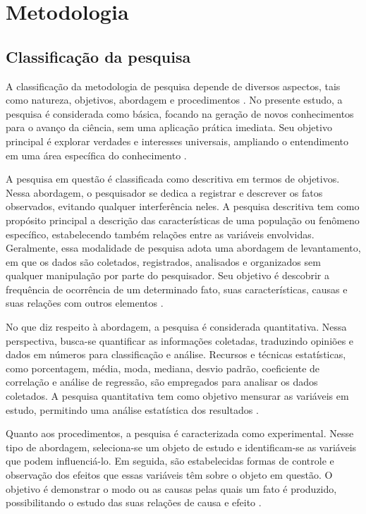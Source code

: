 \chapter[Metodologia]{Metodologia}

\section{Classificação da pesquisa}
A classificação da metodologia de pesquisa depende de diversos aspectos, tais como natureza, objetivos, abordagem e procedimentos . No presente estudo, a pesquisa é considerada como básica, focando na geração de novos conhecimentos para o avanço da ciência, sem uma aplicação prática imediata. Seu objetivo principal é explorar verdades e interesses universais, ampliando o entendimento em uma área específica do conhecimento .

A pesquisa em questão é classificada como descritiva em termos de objetivos. Nessa abordagem, o pesquisador se dedica a registrar e descrever os fatos observados, evitando qualquer interferência neles. A pesquisa descritiva tem como propósito principal a descrição das características de uma população ou fenômeno específico, estabelecendo também relações entre as variáveis envolvidas. Geralmente, essa modalidade de pesquisa adota uma abordagem de levantamento, em que os dados são coletados, registrados, analisados e organizados sem qualquer manipulação por parte do pesquisador. Seu objetivo é descobrir a frequência de ocorrência de um determinado fato, suas características, causas e suas relações com outros elementos .

No que diz respeito à abordagem, a pesquisa é considerada quantitativa. Nessa perspectiva, busca-se quantificar as informações coletadas, traduzindo opiniões e dados em números para classificação e análise. Recursos e técnicas estatísticas, como porcentagem, média, moda, mediana, desvio padrão, coeficiente de correlação e análise de regressão, são empregados para analisar os dados coletados. A pesquisa quantitativa tem como objetivo mensurar as variáveis em estudo, permitindo uma análise estatística dos resultados .

Quanto aos procedimentos, a pesquisa é caracterizada como experimental. Nesse tipo de abordagem, seleciona-se um objeto de estudo e identificam-se as variáveis que podem influenciá-lo. Em seguida, são estabelecidas formas de controle e observação dos efeitos que essas variáveis têm sobre o objeto em questão. O objetivo é demonstrar o modo ou as causas pelas quais um fato é produzido, possibilitando o estudo das suas relações de causa e efeito .

